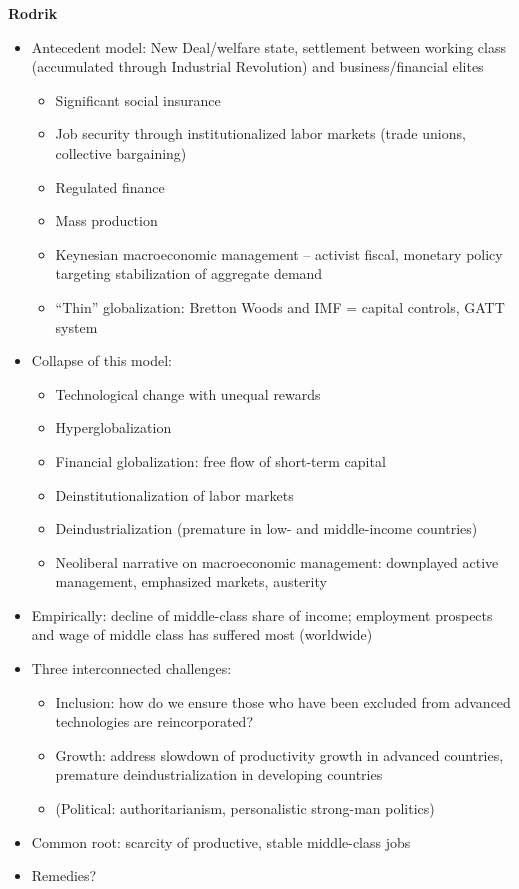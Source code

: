 \textbf{Rodrik}

\begin{itemize}
\tightlist
\item
  Antecedent model: New Deal/welfare state, settlement between working
  class (accumulated through Industrial Revolution) and
  business/financial elites

  \begin{itemize}
  \tightlist
  \item
    Significant social insurance
  \item
    Job security through institutionalized labor markets (trade unions,
    collective bargaining)
  \item
    Regulated finance
  \item
    Mass production
  \item
    Keynesian macroeconomic management -- activist fiscal, monetary
    policy targeting stabilization of aggregate demand
  \item
    ``Thin'' globalization: Bretton Woods and IMF = capital controls,
    GATT system
  \end{itemize}
\item
  Collapse of this model:

  \begin{itemize}
  \tightlist
  \item
    Technological change with unequal rewards
  \item
    Hyperglobalization
  \item
    Financial globalization: free flow of short-term capital
  \item
    Deinstitutionalization of labor markets
  \item
    Deindustrialization (premature in low- and middle-income countries)
  \item
    Neoliberal narrative on macroeconomic management: downplayed active
    management, emphasized markets, austerity
  \end{itemize}
\item
  Empirically: decline of middle-class share of income; employment
  prospects and wage of middle class has suffered most (worldwide)
\item
  Three interconnected challenges:

  \begin{itemize}
  \tightlist
  \item
    Inclusion: how do we ensure those who have been excluded from
    advanced technologies are reincorporated?
  \item
    Growth: address slowdown of productivity growth in advanced
    countries, premature deindustrialization in developing countries
  \item
    (Political: authoritarianism, personalistic strong-man politics)
  \end{itemize}
\item
  Common root: scarcity of productive, stable middle-class jobs
\item
  Remedies?


\end{itemize}
